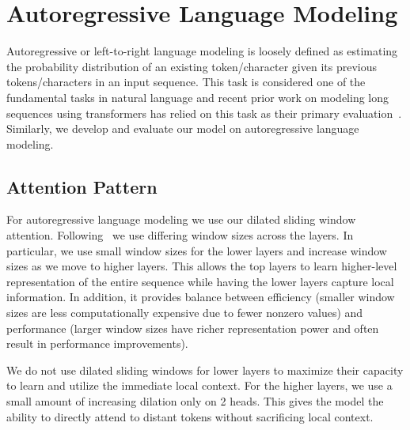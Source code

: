 \section{Autoregressive Language Modeling}
Autoregressive or left-to-right language modeling is loosely defined as estimating the probability distribution of an existing token/character given its previous tokens/characters in an input sequence. 
This task is considered one of the fundamental tasks in natural language and recent prior work on modeling long sequences using transformers 
has relied on this task as their primary evaluation~\cite{transformerxl,compressive,adaptivespan}.
Similarly, we develop and evaluate our model on autoregressive language modeling. 

\subsection{Attention Pattern}
\label{sec:charlm_attn}
For autoregressive language modeling we use our dilated 
sliding window attention. 
Following~\citet{adaptivespan} we use differing window sizes across the layers. In particular, we use small window sizes for the lower layers and increase window sizes 
as we move to higher layers. This allows the top layers to learn higher-level representation of the entire sequence while having the lower layers capture local information. In addition, it provides balance between efficiency (smaller window sizes are less computationally expensive due to fewer nonzero values)
and performance (larger window sizes have richer representation power and often result in performance improvements). 

We do not use dilated sliding windows for lower layers to maximize their capacity to learn and utilize the immediate local context.
For the higher layers, we use a small amount of increasing dilation only on 2 heads.
This gives the model the ability to directly attend to distant tokens without sacrificing local context.


    
